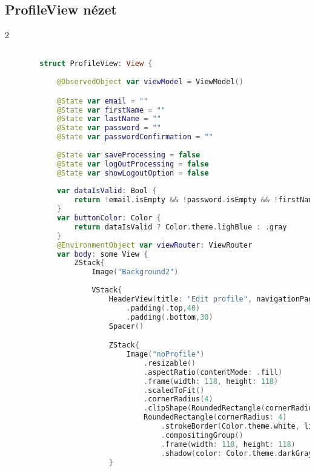 \subsection*{ProfileView nézet}

\begin{spacing}{2}
\end{spacing}
\begin{minipage}{\textwidth}
    \linespread{0.8}\selectfont
    \begin{lstlisting}[language=swift]

        struct ProfileView: View {
            
            @ObservedObject var viewModel = ViewModel()

            @State var email = ""
            @State var firstName = ""
            @State var lastName = ""
            @State var password = ""
            @State var passwordConfirmation = ""
            
            @State var saveProcessing = false
            @State var logOutProcessing = false
            @State var showLogoutOption = false
            
            var dataIsValid: Bool {
                return !email.isEmpty && !password.isEmpty && !firstName.isEmpty && !lastName.isEmpty && !passwordConfirmation.isEmpty && password == passwordConfirmation
            }
            var buttonColor: Color {
                return dataIsValid ? Color.theme.lighBlue : .gray
            }
            @EnvironmentObject var viewRouter: ViewRouter
            var body: some View {
                ZStack{
                    Image("Background2")
                        
                    VStack{
                        HeaderView(title: "Edit profile", navigationPage: .homePage, arrowVisibility: false)
                            .padding(.top,40)
                            .padding(.bottom,30)
                        Spacer()

                        ZStack{
                            Image("noProfile")
                                .resizable()
                                .aspectRatio(contentMode: .fill)
                                .frame(width: 118, height: 118)
                                .scaledToFit()
                                .cornerRadius(4)
                                .clipShape(RoundedRectangle(cornerRadius: 4))
                                RoundedRectangle(cornerRadius: 4)
                                    .strokeBorder(Color.theme.white, lineWidth: 4)
                                    .compositingGroup()
                                    .frame(width: 118, height: 118)
                                    .shadow(color: Color.theme.darkGray,radius: -4, x:0, y:4)
                        }
                        

\end{lstlisting}
\end{minipage}
